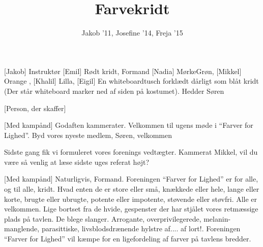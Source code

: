 \documentclass[a4paper,11pt]{article}
\title{Farvekridt}
\author{Jakob '11, Josefine '14, Freja '15}
\begin{document}
\maketitle

\begin{roles}
[Jakob] Instruktør
[Emil] Rødt kridt, Formand
[Nadia] MørkeGrøn,
[Mikkel] Orange , 
[Khalil] Lilla, 
[Eigil] En whiteboardtusch forklædt dårligt som blåt kridt (Der står whiteboard marker ned af siden på kostumet). Hedder Søren
\end{roles}

\begin{props}
[Person, der skaffer]
\end{props}


\begin{sketch}


[Med kampånd] Godaften kammerater. Velkommen til ugens møde i “Farver for Lighed”. Byd vores nyeste medlem, Søren, velkommen 

 

 

 Sidste gang fik vi formuleret vores forenings vedtægter. Kammerat Mikkel, vil du være så venlig at læse sidste uges referat højt?

[Med kampånd] Naturligvis, Formand.  Foreningen “Farver for Lighed” er for alle, og til alle, kridt. Hvad enten de er store eller små, knækkede eller hele, lange eller korte, brugte eller ubrugte, potente eller impotente, støvende eller støvfri. Alle er velkommen.  Lige bortset fra de hvide, gespenster der har stjålet vores retmæssige plads på tavlen. De blege slanger. Arrogante, overprivilegerede, melanin-manglende, parasittiske, livsblodsdrænende hylstre af.... af lort!. 
 Foreningen “Farver for Lighed” vil kæmpe for en ligefordeling af farver på tavlens bredder. 


\end{sketch}
\end{document}
